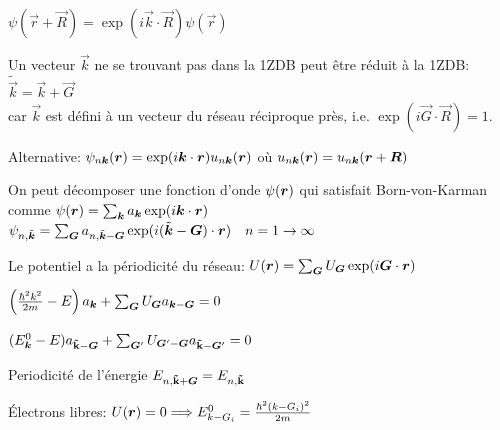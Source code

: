 \begin{squishlist}
    \item $\psi(\vec{r} + \vec{R}) = \exp(i\vec{k} \cdot \vec{R}) \psi(\vec{r})$
    \item Un vecteur $\vec{k}$ ne se trouvant pas dans la 1ZDB peut être réduit à la 1ZDB: $\tilde{\vec{k}} = \vec{k} + \vec{G}$ \\
    car $\vec{k}$ est défini à un vecteur du réseau réciproque près, i.e. $\exp(i \vec{G}\cdot \vec{R}) = 1$.
    \item Alternative: $\psi_{n \bm{k}}(\bm{r}) = \exp(i \bm{k} \cdot \bm{r} ) u_{n \bm{k}}(\bm{r})$ où $u_{n \bm{k}}(\bm{r}) =  u_{n \bm{k}}(\bm{r}+ \bm{R})$
\end{squishlist}

\begin{squishlist}
    \item On peut décomposer une fonction d'onde $\psi(\bm{r})$ qui satisfait Born-von-Karman comme $\psi(\bm{r}) = \sum_{\bm{k}} a_{\bm{k}} \exp(i \bm{k} \cdot \bm{r})$
    \squishsep $\psi_{n,\tilde{\bm{k}}} = \sum_{\bm{G}} a_{n, \tilde{\bm{k}}-\bm{G}} \exp(i (\tilde{\bm{k}} - \bm{G}) \cdot \bm{r}) \quad n=1\rightarrow\infty$
    \item Le potentiel a la périodicité du réseau: $U(\bm{r}) = \sum_{\bm{G}} U_{\bm{G}} \exp(i \bm{G} \cdot \bm{r})$
    \item $\left(\frac{\hbar^2 k^2}{2m} - E\right)a_{\bm{k}} + \sum_{\bm{G}}U_{\bm{G}}a_{\bm{k} - \bm{G}}  = 0$
    \item $(E_{\bm{k}}^0 - E)a_{\mathbf{{\tilde{k}}} - \bm{G}} + \sum_{\bm{G}'}U_{\bm{G}' - \bm{G}}a_{\mathbf{\tilde{k}} - \bm{G}'}  = 0$
    \item Periodicité de l'énergie $ E_{n,\mathbf{\tilde{k}} + \bm{G}} = E_{n,\mathbf{\tilde{k}}}$
    \item Électrons libres: $U(\bm{r}) = 0 \Longrightarrow E_{k - G_i}^0 = \frac{\hbar^2(k - G_i)^2}{2m}$
\end{squishlist}

